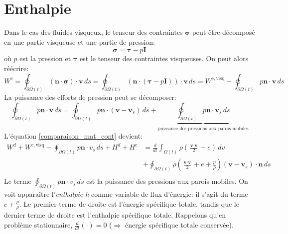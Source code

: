 \section{Enthalpie}
Dans le cas des fluides visqueux, le tenseur des contraintes $\boldsymbol{\sigma}$ peut être décomposé en une partie visqueuse et une partie de pression:
$$\boldsymbol{\sigma}=\boldsymbol{\tau}-p\textbf{I}$$ où $p$ est la pression et $\boldsymbol{\tau}$ est le tenseur des contraintes visqueuses. On peut alors réécrire:
$$W^c=\oint_{\partial\Omega (t)}(\textbf{\^n}\cdot\boldsymbol{\sigma})\cdot\textbf{v}\,ds=\oint_{\partial\Omega (t)}(\textbf{\^n}\cdot(\boldsymbol{\tau}-p\textbf{I}))\cdot\textbf{v}\,ds=W^{c,\text{visq}}-\oint_{\partial\Omega (t)}p\textbf{\^n}\cdot\textbf{v}\,ds$$
La puissance des efforts de pression peut se décomposer:
$$\oint_{\partial\Omega (t)}p\textbf{\^n}\cdot\textbf{v}\,ds=\oint_{\partial\Omega (t)}p\textbf{\^n}\cdot(\textbf{v}-\textbf{v}_s)\,ds+\underbrace{\oint_{\partial\Omega (t)}p\textbf{\^n}\cdot\textbf{v}_s\,ds}_{\text{puissance des pressions aux parois mobiles}}$$
L'équation \ref{comparaison_mat_cont} devient:
\begin{align*}
W^d+W^{c,\text{visq}}-\oint_{\partial\Omega (t)}p\textbf{\^n}\cdot{v}_s\,ds+H^d+H^c&=\frac{d}{dt}\int_{\Omega (t)}\rho\left(\frac{\textbf{v}\cdot\textbf{v}}{2}+e\right)\,dv\\
 &+\oint_{\partial\Omega (t)}\rho\left(\frac{\textbf{v}\cdot\textbf{v}}{2}+e+\frac{p}{\rho}\right)(\textbf{v}-\textbf{v}_s)\cdot\textbf{\^n}\,ds\\
\end{align*}
Le terme $\oint_{\partial\Omega (t)}p\textbf{\^n}\cdot{v}_s\,ds$ est la puissance des pressions aux parois mobiles. On voit apparaître l'\emph{enthalpie h} comme variable de flux d'énergie: il s'agit du terme $e+\frac{p}{\rho}$. Le premier terme de droite est l'énergie spécifique totale, tandis que le dernier terme de droite est l'enthalpie spécifique totale. Rappelons qu'en problème stationnaire, $\frac{d}{dt}(\cdot)=0$ ($\Rightarrow$ énergie spécifique totale conservée). 

